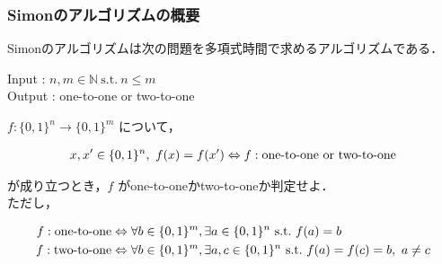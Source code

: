 \documentclass[dvipdfmx,12pt]{beamer}%
\begin{document}
\begin{frame}

\frametitle{Simonのアルゴリズムの概要}
      
Simonのアルゴリズムは次の問題を多項式時間で求めるアルゴリズムである． \\

\vspace{10pt}

Input : $n, m \in \mathbb{N} \ \mathrm{s.t.} \ n \leq m$ \\
Output : one-to-one or two-to-one \\

\vspace{10pt}

$ f : \{ 0, 1 \}^n \rightarrow \{ 0, 1 \}^m $ について，\vspace{-15pt}

\begin{align*}
    x , x^{\prime} \in \{0, 1\}^n, \  f(x) = f(x^{\prime}) \Leftrightarrow f : \mathrm{one} \mathchar`- \mathrm{to} \mathchar`- \mathrm{one} \ \mathrm{or} \ \mathrm{two} \mathchar`- \mathrm{to} \mathchar`- \mathrm{one}   
\end{align*}

が成り立つとき，$f$ がone-to-oneかtwo-to-oneか判定せよ．\\
ただし，\vspace{-15pt}

\footnotesize
\begin{align*}
    f : \mathrm{one} \mathchar`- \mathrm{to} \mathchar`- \mathrm{one} & \Leftrightarrow \forall b \in \{ 0, 1 \}^m, \exists a \in \{ 0, 1 \}^n \ \mathrm{s.t.} \ f(a) = b \\
    f : \mathrm{two} \mathchar`- \mathrm{to} \mathchar`- \mathrm{one} & \Leftrightarrow \forall b \in \{ 0, 1 \}^m, \exists a, c \in \{ 0, 1 \}^n \ \mathrm{s.t.} \ f(a) = f(c) = b, \ a \neq c
\end{align*}
\normalsize
          
\end{frame}
\end{document}

